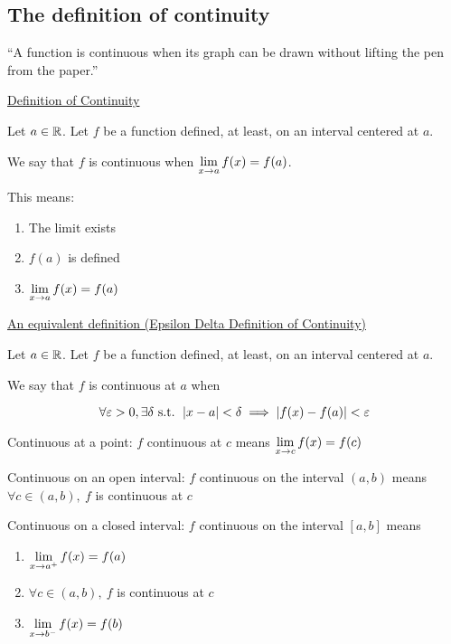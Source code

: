 \subsection{The definition of continuity}

``A function is continuous when its graph can be drawn without lifting the pen from the paper.''

\begin{mdframed}

  \underline{Definition of Continuity}

  Let \(a \in \mathbb{R}\). Let \(f\) be a function defined, at least, on an interval centered at \(a\).

  We say that \(f\) is continuous when \(\displaystyle \lim_{x \to a} f(x) = f(a)\).
\end{mdframed}

This means:
\begin{enumerate}
  \item The limit exists
  \item \(f(a)\) is defined
  \item \(\displaystyle \lim_{x \to a} f(x) = f(a)\)
\end{enumerate}

\begin{mdframed}

  \underline{An equivalent definition (Epsilon Delta Definition of Continuity)}

  Let \(a \in \mathbb{R}\). Let \(f\) be a function defined, at least, on an interval centered at \(a\).

  We say that \(f\) is continuous at \(a\) when

  \[\forall \varepsilon > 0, \exists \delta \text{ s.t. } \left|x - a\right| < \delta \implies \left|f(x) - f(a)\right| < \varepsilon\]

\end{mdframed}

Continuous at a point: \(f\) continuous at \(c\) means \(\displaystyle \lim_{x \to c} f(x) = f(c)\)

Continuous on an open interval: \(f\) continuous on the interval \((a, b)\) means \(\forall c \in (a, b),~f\) is continuous at \(c\)

Continuous on a closed interval: \(f\) continuous on the interval \([a, b]\) means
\begin{enumerate}
  \item \(\displaystyle \lim_{x \to a^{+}} f(x) = f(a)\)
  \item \(\forall c \in (a, b),~f\) is continuous at \(c\)
  \item \(\displaystyle \lim_{x \to b^{-}} f(x) = f(b)\)
\end{enumerate}

